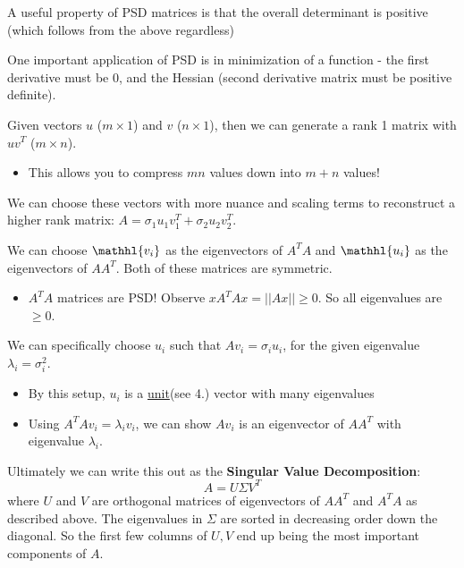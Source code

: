 \documentclass[12pt]{article} %
\begin{document}
A useful property of PSD matrices is that the overall determinant is positive (which follows from the above regardless)

One important application of PSD is in minimization of a function - the first derivative must be 0, and the Hessian (second derivative matrix must be positive definite).


\newpage
{}
Given vectors $u$ ($m \times 1$) and $v$ ($n \times 1$), then we can generate a rank 1 matrix with $uv^T$ ($m\times n$).
\begin{itemize}[topsep=-1pt,itemsep=-1pt]
    \item This allows you to compress $mn$ values down into $m+n$ values!
\end{itemize}
We can choose these vectors with more nuance and scaling terms to reconstruct a higher rank matrix: $A = \sigma_1 u_1 v_1^T + \sigma_2 u_2 v_2^T$.

We can choose $\mathhl{v_i}$ as the eigenvectors of $A^TA$ and $\mathhl{u_i}$ as the eigenvectors of $AA^T$. Both of these matrices are symmetric.
\begin{itemize}[topsep=-1pt,itemsep=-1pt]
    \item $A^TA$ matrices are PSD! Observe $xA^TAx = ||Ax|| \geq 0$. So all eigenvalues are $\geq 0$.
\end{itemize}
We can specifically choose $u_i$ such that $Av_i = \sigma_i u_i$, for the given eigenvalue $\lambda_i = \sigma^2_i$.
\begin{itemize}[topsep=-1pt,itemsep=-1pt]
    \item By this setup, $u_i$ is a \href{https://gregorygundersen.com/blog/2018/12/20/svd-proof/#4-textbfu_i-is-a-unit-eigenvector-of-aatop}{unit}(see 4.) vector with many eigenvalues
    \item Using $A^TAv_i = \lambda_i v_i$, we can show $Av_i$ is an eigenvector of $AA^T$ with eigenvalue $\lambda_i$.
\end{itemize}
Ultimately we can write this out as the \textbf{Singular Value Decomposition}:
\begin{equation*}
    A = U \Sigma V^T
\end{equation*}
where $U$ and $V$ are orthogonal matrices of eigenvectors of $AA^T$ and $A^TA$ as described above. The eigenvalues in $\Sigma$ are sorted in decreasing order down the diagonal. So the first few columns of $U,V$ end up being the most important components of $A$.
\end{document}
